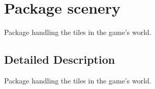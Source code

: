 \hypertarget{namespacescenery}{\section{Package scenery}
\label{namespacescenery}
}


Package handling the tiles in the game's world.  




\subsection{Detailed Description}
Package handling the tiles in the game's world. 